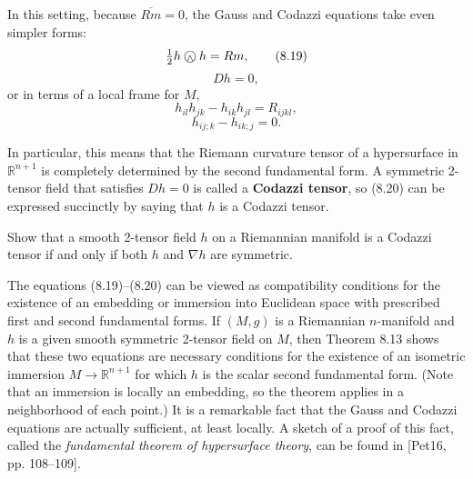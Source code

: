 In this setting, because $\overline{Rm} = 0$, the Gauss and Codazzi equations take even simpler forms:
\begin{equation}
\tfrac{1}{2}h \owedge h = Rm,
\tag{8.19}
\end{equation}
\begin{equation}
Dh = 0,
\tag{8.20}
\end{equation}
or in terms of a local frame for $M$,
\begin{equation}
h_{il}h_{jk} - h_{ik}h_{jl} = R_{ijkl},
\tag{8.21}
\end{equation}
\begin{equation}
h_{ij;k} - h_{ik;j} = 0.
\tag{8.22}
\end{equation}

In particular, this means that the Riemann curvature tensor of a hypersurface in $\mathbb{R}^{n+1}$ is completely determined by the second fundamental form. A symmetric 2-tensor field that satisfies $Dh = 0$ is called a \textbf{Codazzi tensor}, so (8.20) can be expressed succinctly by saying that $h$ is a Codazzi tensor.

\begin{exercise}
\label{exer:codazzi-tensor-characterization}
Show that a smooth 2-tensor field $h$ on a Riemannian manifold is a Codazzi tensor if and only if both $h$ and $\nabla h$ are symmetric.
\end{exercise}

The equations (8.19)--(8.20) can be viewed as compatibility conditions for the existence of an embedding or immersion into Euclidean space with prescribed first and second fundamental forms. If $(M, g)$ is a Riemannian $n$-manifold and $h$ is a given smooth symmetric 2-tensor field on $M$, then Theorem 8.13 shows that these two equations are necessary conditions for the existence of an isometric immersion $M \to \mathbb{R}^{n+1}$ for which $h$ is the scalar second fundamental form. (Note that an immersion is locally an embedding, so the theorem applies in a neighborhood of each point.) It is a remarkable fact that the Gauss and Codazzi equations are actually sufficient, at least locally. A sketch of a proof of this fact, called the \emph{fundamental theorem of hypersurface theory}, can be found in [Pet16, pp. 108--109].


